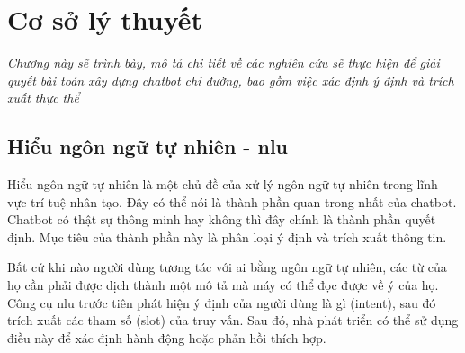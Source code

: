 \chapter{Cơ sở lý thuyết}
\label{Chapter3}

\emph{Chương này sẽ trình bày, mô tả chi tiết về các nghiên cứu sẽ thực hiện để giải quyết bài toán xây dựng chatbot chỉ đường, bao gồm việc xác định ý định và trích xuất thực thể}

\section{Hiểu ngôn ngữ tự nhiên - \ac{nlu}}

Hiểu ngôn ngữ tự nhiên là một chủ đề của xử lý ngôn ngữ tự nhiên trong lĩnh vực trí tuệ nhân tạo. Đây có thể nói là thành phần quan trong nhất của chatbot. Chatbot có thật sự thông minh hay không thì đây chính là thành phần quyết định. Mục tiêu của thành phần này là phân loại ý định và trích xuất thông tin.

Bất cứ khi nào người dùng tương tác với \ac{ai} bằng ngôn ngữ tự nhiên, các từ của họ cần phải được dịch thành một mô tả mà máy có thể đọc được về ý của họ.
Công cụ \ac{nlu} trước tiên phát hiện ý định của người dùng là gì (intent), sau đó trích xuất các tham số (slot) của truy vấn. Sau đó, nhà phát triển có thể sử dụng điều này để xác định hành động hoặc phản hồi thích hợp.

